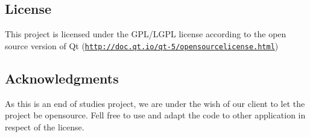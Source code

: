 \subsection*{License}

This project is licensed under the G\+P\+L/\+L\+G\+PL license according to the open source version of Qt (\href{http://doc.qt.io/qt-5/opensourcelicense.html}{\tt http\+://doc.\+qt.\+io/qt-\/5/opensourcelicense.\+html})

\subsection*{Acknowledgments}

As this is an end of studies\textquotesingle{} project, we are under the wish of our client to let the project be opensource. Fell free to use and adapt the code to other application in respect of the license. 